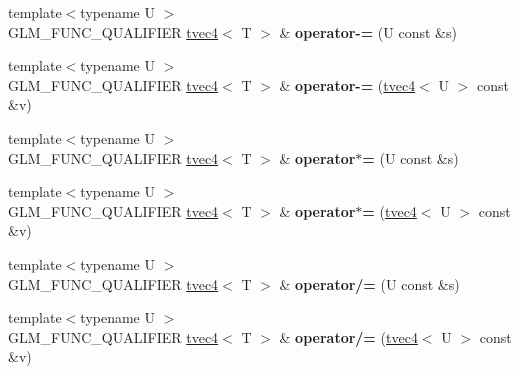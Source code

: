 \begin{DoxyCompactItemize}
\item 
\hypertarget{structglm_1_1detail_1_1tvec4_ae4f2e7aeeb141a09c40ec237b06640a2}{}{\footnotesize template$<$typename U $>$ }\\G\+L\+M\+\_\+\+F\+U\+N\+C\+\_\+\+Q\+U\+A\+L\+I\+F\+I\+E\+R \hyperlink{structglm_1_1detail_1_1tvec4}{tvec4}$<$ T $>$ \& {\bfseries operator-\/=} (U const \&s)\label{structglm_1_1detail_1_1tvec4_ae4f2e7aeeb141a09c40ec237b06640a2}

\item 
\hypertarget{structglm_1_1detail_1_1tvec4_a4b723d5af6f90b0cce671e3f197c015e}{}{\footnotesize template$<$typename U $>$ }\\G\+L\+M\+\_\+\+F\+U\+N\+C\+\_\+\+Q\+U\+A\+L\+I\+F\+I\+E\+R \hyperlink{structglm_1_1detail_1_1tvec4}{tvec4}$<$ T $>$ \& {\bfseries operator-\/=} (\hyperlink{structglm_1_1detail_1_1tvec4}{tvec4}$<$ U $>$ const \&v)\label{structglm_1_1detail_1_1tvec4_a4b723d5af6f90b0cce671e3f197c015e}

\item 
\hypertarget{structglm_1_1detail_1_1tvec4_aa77551306d13abb5b165984f98da45da}{}{\footnotesize template$<$typename U $>$ }\\G\+L\+M\+\_\+\+F\+U\+N\+C\+\_\+\+Q\+U\+A\+L\+I\+F\+I\+E\+R \hyperlink{structglm_1_1detail_1_1tvec4}{tvec4}$<$ T $>$ \& {\bfseries operator$\ast$=} (U const \&s)\label{structglm_1_1detail_1_1tvec4_aa77551306d13abb5b165984f98da45da}

\item 
\hypertarget{structglm_1_1detail_1_1tvec4_a669b40611304d82c6dbc8352cc4ea6a6}{}{\footnotesize template$<$typename U $>$ }\\G\+L\+M\+\_\+\+F\+U\+N\+C\+\_\+\+Q\+U\+A\+L\+I\+F\+I\+E\+R \hyperlink{structglm_1_1detail_1_1tvec4}{tvec4}$<$ T $>$ \& {\bfseries operator$\ast$=} (\hyperlink{structglm_1_1detail_1_1tvec4}{tvec4}$<$ U $>$ const \&v)\label{structglm_1_1detail_1_1tvec4_a669b40611304d82c6dbc8352cc4ea6a6}

\item 
\hypertarget{structglm_1_1detail_1_1tvec4_a212fbfca7e7df1471c42e92e2d69315a}{}{\footnotesize template$<$typename U $>$ }\\G\+L\+M\+\_\+\+F\+U\+N\+C\+\_\+\+Q\+U\+A\+L\+I\+F\+I\+E\+R \hyperlink{structglm_1_1detail_1_1tvec4}{tvec4}$<$ T $>$ \& {\bfseries operator/=} (U const \&s)\label{structglm_1_1detail_1_1tvec4_a212fbfca7e7df1471c42e92e2d69315a}

\item 
\hypertarget{structglm_1_1detail_1_1tvec4_abc19b0306f0709294ffbdec9583ec779}{}{\footnotesize template$<$typename U $>$ }\\G\+L\+M\+\_\+\+F\+U\+N\+C\+\_\+\+Q\+U\+A\+L\+I\+F\+I\+E\+R \hyperlink{structglm_1_1detail_1_1tvec4}{tvec4}$<$ T $>$ \& {\bfseries operator/=} (\hyperlink{structglm_1_1detail_1_1tvec4}{tvec4}$<$ U $>$ const \&v)\label{structglm_1_1detail_1_1tvec4_abc19b0306f0709294ffbdec9583ec779}


\end{DoxyCompactItemize}
